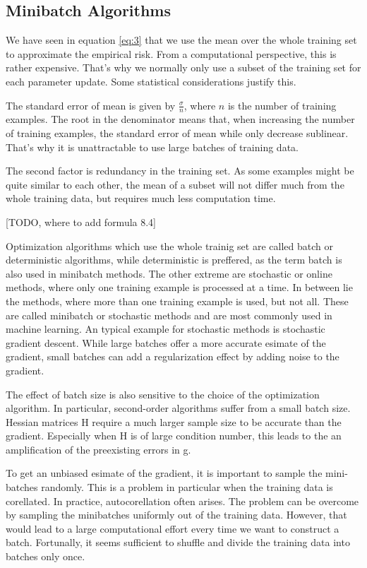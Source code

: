 \subsection{Minibatch Algorithms}
We have seen in equation \ref{eq:3} that we use the mean over the whole training
set to approximate the empirical risk. From a computational perspective, this is
rather expensive. That's why we normally only use a subset of the training set
for each parameter update. Some statistical considerations justify this.

The standard error of mean is given by $\frac{\sigma}{n}$, where $n$ is the
number of training examples. The root in the denominator means that, when
increasing the number of training examples, the standard error of mean while
only decrease sublinear. That's why it is unattractable to use large batches of
training data.

The second factor is redundancy in the training set. As some examples might be
quite similar to each other, the mean of a subset will not differ much from the
whole training data, but requires much less computation time.


[TODO, where to add formula 8.4]

Optimization algorithms which use the whole trainig set are called batch or
deterministic algorithms, while deterministic is preffered, as the term batch is
also used in minibatch methods.
The other extreme are stochastic or online methods, where only one training
example is processed at a time.
In between lie the methods, where more than one training example is used, but
not all. These are called minibatch or stochastic methods and are most commonly
used in machine learning.\newline
An typical example for stochastic methods is stochastic gradient descent.
While large batches offer a more accurate esimate of the gradient, small batches
can add a regularization effect by adding noise to the gradient.

The effect of batch size is also sensitive to the choice of the optimization
algorithm. In particular, second-order algorithms suffer from a small batch
size. Hessian matrices H require a much larger sample size to be accurate than
the gradient. Especially when H is of large condition number, this leads to the
an amplification of the preexisting errors in g.

To get an unbiased esimate of the gradient, it is important to sample the
mini-batches randomly. This is a problem in particular when the training data is
corellated. In practice, autocorellation often arises. The problem can be
overcome by sampling the minibatches uniformly out of the training data.
However, that would lead to a large computational effort every time we want to
construct a batch. Fortunally, it seems sufficient to shuffle and divide the
training data into batches only once.

